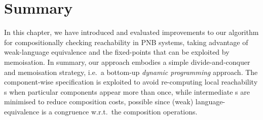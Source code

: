 \section{Summary}

In this chapter, we have introduced and evaluated improvements to our algorithm
for compositionally checking reachability in PNB systems, taking advantage of
weak-language equivalence and the fixed-points that can be exploited by
memoisation.  In summary, our approach embodies a simple divide-and-conquer and
memoisation strategy, i.e.\ a bottom-up \emph{dynamic programming} approach.
The component-wise specification is exploited to avoid re-computing local
reachability \TNFA{}s when particular components appear more than once, while
intermediate \TNFA{}s are minimised to reduce composition costs, possible since
\TNFA{} (weak) language-equivalence is a congruence w.r.t.\ the composition
operations.

